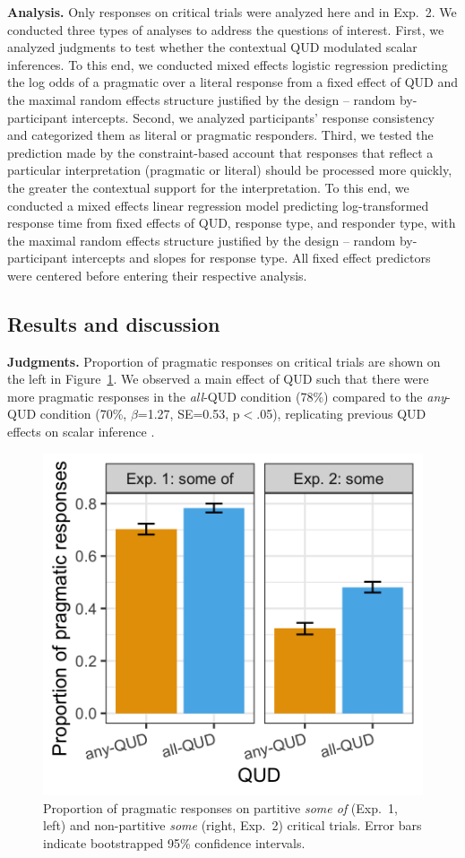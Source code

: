 \documentclass[10pt,letterpaper]{article}
\begin{document}
 
\noindent \textbf{Analysis.}  Only responses on critical trials were  analyzed here and in Exp.~2. We conducted three types of analyses to address the questions of interest. First, we analyzed judgments to test whether the contextual QUD modulated scalar inferences. To this end, we conducted mixed effects logistic regression predicting the log odds of a pragmatic over a literal response from a fixed effect of QUD and the maximal random effects structure justified by the design --  random by-participant intercepts. Second, we analyzed participants' response consistency and categorized them as  literal or pragmatic responders. Third, we tested the prediction made by the constraint-based account  that responses that reflect a particular interpretation (pragmatic or literal) should be processed more quickly, the greater the contextual support for the interpretation. To this end, we conducted a mixed effects linear regression model predicting log-transformed response time from fixed effects of QUD, response type, and responder type, with the maximal random effects structure justified by the design -- random by-participant intercepts and slopes for response type. All fixed effect predictors were centered before entering their respective analysis.
 
 
\subsection{Results and discussion}


\noindent \textbf{Judgments.} Proportion of pragmatic responses on critical trials are shown on the left in Figure~\ref{fig:judgments}. We observed a main effect of QUD such that there were more pragmatic responses in the \textit{all}-QUD condition (78\%) compared to the \textit{any}-QUD condition (70\%, $\beta$=1.27, SE=0.53, p$<$.05), replicating previous QUD effects on scalar inference \cite{DegenGoodman2014,Zondervan2010}. 


\begin{figure}
\centering
  \includegraphics[width=.75\columnwidth]{plots/judgements.png}
  \caption{Proportion of pragmatic responses on partitive \emph{some of} (Exp.~1, left) and non-partitive \emph{some} (right, Exp.~2) critical trials. Error bars indicate bootstrapped 95\% confidence intervals. \label{fig:judgments}}
  \end{figure}
\end{document}
